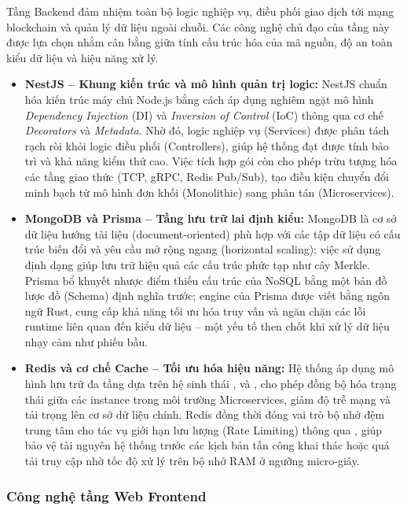 Tầng Backend đảm nhiệm toàn bộ logic nghiệp vụ, điều phối giao dịch tới mạng blockchain và quản lý dữ liệu ngoài chuỗi. Các công nghệ chủ đạo của tầng này được lựa chọn nhằm cân bằng giữa tính cấu trúc hóa của mã nguồn, độ an toàn kiểu dữ liệu và hiệu năng xử lý.

\begin{itemize}
    \item \textbf{NestJS -- Khung kiến trúc và mô hình quản trị logic:} NestJS chuẩn hóa kiến trúc máy chủ Node.js bằng cách áp dụng nghiêm ngặt mô hình \textit{Dependency Injection} (DI) và \textit{Inversion of Control} (IoC) thông qua cơ chế \textit{Decorators} và \textit{Metadata}. Nhờ đó, logic nghiệp vụ (Services) được phân tách rạch ròi khỏi logic điều phối (Controllers), giúp hệ thống đạt được tính bảo trì và khả năng kiểm thử cao. Việc tích hợp gói  còn cho phép trừu tượng hóa các tầng giao thức (TCP, gRPC, Redis Pub/Sub), tạo điều kiện chuyển đổi minh bạch từ mô hình đơn khối (Monolithic) sang phân tán (Microservices).

    \item \textbf{MongoDB và Prisma -- Tầng lưu trữ lai định kiểu:} MongoDB là cơ sở dữ liệu hướng tài liệu (document-oriented) phù hợp với các tập dữ liệu có cấu trúc biến đổi và yêu cầu mở rộng ngang (horizontal scaling); việc sử dụng định dạng  giúp lưu trữ hiệu quả các cấu trúc phức tạp như cây Merkle. Prisma bổ khuyết nhược điểm thiếu cấu trúc của NoSQL bằng một bản đồ lược đồ (Schema) định nghĩa trước; engine của Prisma được viết bằng ngôn ngữ Rust, cung cấp khả năng tối ưu hóa truy vấn và ngăn chặn các lỗi runtime liên quan đến kiểu dữ liệu -- một yếu tố then chốt khi xử lý dữ liệu nhạy cảm như phiếu bầu.

    \item \textbf{Redis và cơ chế Cache -- Tối ưu hóa hiệu năng:} Hệ thống áp dụng mô hình lưu trữ đa tầng dựa trên hệ sinh thái ,  và , cho phép đồng bộ hóa trạng thái giữa các instance trong môi trường Microservices, giảm độ trễ mạng và tải trọng lên cơ sở dữ liệu chính. Redis đồng thời đóng vai trò bộ nhớ đệm trung tâm cho tác vụ giới hạn lưu lượng (Rate Limiting) thông qua , giúp bảo vệ tài nguyên hệ thống trước các kịch bản tấn công khai thác hoặc quá tải truy cập nhờ tốc độ xử lý trên bộ nhớ RAM ở ngưỡng micro-giây.
\end{itemize}

\subsubsection{Công nghệ tầng Web Frontend}

